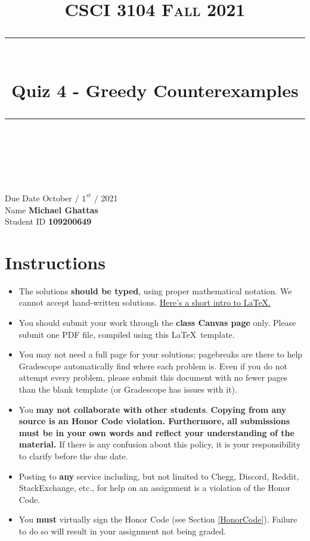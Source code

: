 \documentclass[11pt]{article}
\title{
\normalfont \normalsize 
\textsc{CSCI 3104 Fall 2021} \\
[10pt] 
\rule{\linewidth}{0.5pt} \\[6pt] 
\huge Quiz 4 - Greedy Counterexamples \\
\rule{\linewidth}{2pt}  \\[10pt]
}
\date{}
\theoremstyle{definition}
\theoremstyle{definition}
\theoremstyle{definition}
\begin{document}
\maketitle


\noindent
Due Date \dotfill October / $1^{st}$ / 2021 \\
Name \dotfill \textbf{Michael Ghattas} \\
Student ID \dotfill \textbf{109200649} \\


\tableofcontents

\section{Instructions}
 \begin{itemize}
	\item The solutions \textbf{should be typed}, using proper mathematical notation. We cannot accept hand-written solutions. \href{http://ece.uprm.edu/~caceros/latex/introduction.pdf}{Here's a short intro to \LaTeX.}
	\item You should submit your work through the \textbf{class Canvas page} only. Please submit one PDF file, compiled using this \LaTeX \ template.
	\item You may not need a full page for your solutions; pagebreaks are there to help Gradescope automatically find where each problem is. Even if you do not attempt every problem, please submit this document with no fewer pages than the blank template (or Gradescope has issues with it).

	\item You \textbf{may not collaborate with other students}. \textbf{Copying from any source is an Honor Code violation. Furthermore, all submissions must be in your own words and reflect your understanding of the material.} If there is any confusion about this policy, it is your responsibility to clarify before the due date. 

	\item Posting to \textbf{any} service including, but not limited to Chegg, Discord, Reddit, StackExchange, etc., for help on an assignment is a violation of the Honor Code.

	\item You \textbf{must} virtually sign the Honor Code (see Section \ref{HonorCode}). Failure to do so will result in your assignment not being graded.
\end{itemize}
\end{document}
